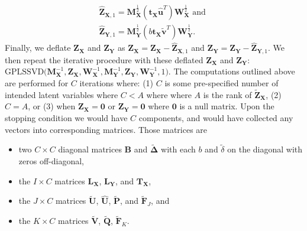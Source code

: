 \documentclass[12pt]{article}
\begin{document}
\begin{equation}
\begin{aligned}
\widehat{\mathbf Z}_{{\mathbf X},1} = {\mathbf M}_{\mathbf X}^{\frac{1}{2}}({\mathbf t}_{\mathbf X}\widehat{\mathbf u}^{T}){\mathbf W}_{\mathbf X}^{\frac{1}{2}} \text{ and } \\
\widehat{\mathbf Z}_{{\mathbf Y},1} = {\mathbf M}_{\mathbf Y}^{\frac{1}{2}}(b{\mathbf t}_{\mathbf X}\widetilde{\mathbf v}^{T}){\mathbf W}_{\mathbf Y}^{\frac{1}{2}}.
\label{eq:rank1_preds_plscar}
\end{aligned}
\end{equation} Finally, we deflate \({\mathbf Z}_{\mathbf X}\) and
\({\mathbf Z}_{\mathbf Y}\) as
\({\mathbf Z}_{\mathbf X} = {\mathbf Z}_{\mathbf X} - \widehat{\mathbf Z}_{{\mathbf X},1}\)
and
\({\mathbf Z}_{\mathbf Y} = {\mathbf Z}_{\mathbf Y} - \widehat{\mathbf Z}_{{\mathbf Y},1}\).
We then repeat the iterative procedure with these deflated
\({\mathbf Z}_{\mathbf X}\) and \({\mathbf Z}_{\mathbf Y}\):
\(\mathrm{GPLSSVD(} {\mathbf M}_{\mathbf X}^{-1}, {\mathbf Z}_{\mathbf X}, {\mathbf W}_{\mathbf X}^{-1}, {\mathbf M}_{\mathbf Y}^{-1}, {\mathbf Z}_{\mathbf Y}, {\mathbf W}_{\mathbf Y}^{-1}, 1 \mathrm{)}\).
The computations outlined above are performed for \(C\) iterations
where: (1) \(C\) is some pre-specified number of intended latent
variables where \(C < A\) where where \(A\) is the rank of
\(\widetilde{\mathbf Z}_{\mathbf X}\), (2) \(C=A\), or (3) when
\({\mathbf Z}_{\mathbf X} = {\mathbf 0}\) or
\({\mathbf Z}_{\mathbf Y} = {\mathbf 0}\) where \({\mathbf 0}\) is a
null matrix. Upon the stopping condition we would have \(C\) components,
and would have collected any vectors into corresponding matrices. Those
matrices are

\begin{itemize}
\item
  two \(C \times C\) diagonal matrices \({\mathbf B}\) and
  \(\widetilde{\boldsymbol \Delta}\) with each \(b\) and
  \(\tilde\delta\) on the diagonal with zeros off-diagonal,
\item
  the \(I \times C\) matrices \({\mathbf L}_{\mathbf X}\),
  \({\mathbf L}_{\mathbf Y}\), and \({\mathbf T}_{\mathbf X}\),
\item
  the \(J \times C\) matrices \(\widetilde{\mathbf U}\),
  \(\widehat{\mathbf U}\), \(\widetilde{\mathbf P}\), and
  \(\widetilde{\mathbf F}_{J}\), and
\item
  the \(K \times C\) matrices \(\widetilde{\mathbf V}\),
  \(\widetilde{\mathbf Q}\), \(\widetilde{\mathbf F}_{K}\).
\end{itemize}
\end{document}
